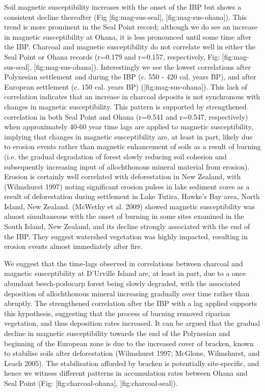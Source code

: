 Soil magnetic susceptibility increases with the onset of the IBP but
shows a consistent decline thereafter (Fig {[}fig:mag-sus-seal{]},
{[}fig:mag-sus-ohana{]}). This trend is more prominent in the Seal Point
record; although we do see an increase in magnetic susceptibility at
Ohana, it is less pronounced until some time after the IBP. Charcoal and
magnetic susceptibility do not correlate well in either the Seal Point
or Ohana records (r=0.179 and r=0.157, respectively, Fig:
{[}fig:mag-sus-seal{]}, {[}fig:mag-sus-ohana{]}). Interestingly we see
the lowest correlations after Polynesian settlement and during the IBP
(c. 550 - 420 cal. years BP), and after European settlement (c. 150 cal.
years BP) ({[}fig:mag-sus-ohana{]}). This lack of correlation indicates
that an increase in charcoal deposits is not synchronous with changes in
magnetic susceptibility. This pattern is supported by strengthened
correlation in both Seal Point and Ohana (r=0.541 and r=0.547,
respectively) when approximately 40-60 year time lags are applied to
magnetic susceptibility, implying that changes in magnetic
susceptibility are, at least in part, likely due to erosion events
rather than magnetic enhancement of soils as a result of burning (i.e.
the gradual degradation of forest slowly reducing soil cohesion and
subsequently increasing input of allochthonous mineral material from
erosion). Erosion is certainly well correlated with deforestation in New
Zealand, with (Wilmshurst 1997) noting significant erosion pulses in
lake sediment cores as a result of deforestation during settlement in
Lake Tutira, Hawke's Bay area, North Island, New Zealand. (McWethy et
al. 2009) showed magnetic susceptibility was almost simultaneous with
the onset of burning in some sites examined in the South Island, New
Zealand, and its decline strongly associated with the end of the IBP.
They suggest watershed vegetation was highly impacted, resulting in
erosion events almost immediately after fire.

We suggest that the time-lags observed in correlations between charcoal
and magnetic susceptibility at D'Urville Island are, at least in part,
due to a once abundant beech-podocarp forest being slowly degraded, with
the associated deposition of allochthonous mineral increasing gradually
over time rather than abruptly. The strengthened correlation after the
IBP with a lag applied supports this hypothesis, suggesting that the
process of burning removed riparian vegetation, and thus deposition
rates increased. It can be argued that the gradual decline in magnetic
susceptibility towards the end of the Polynesian and beginning of the
European zone is due to the increased cover of bracken, known to
stabilise soils after deforestation (Wilmshurst 1997; McGlone,
Wilmshurst, and Leach 2005). The stabilisation afforded by bracken is
potentially site-specific, and hence we witness different patterns in
accumulation rates between Ohana and Seal Point (Fig:
{[}fig:charcoal-ohana{]}, {[}fig:charcoal-seal{]}).

